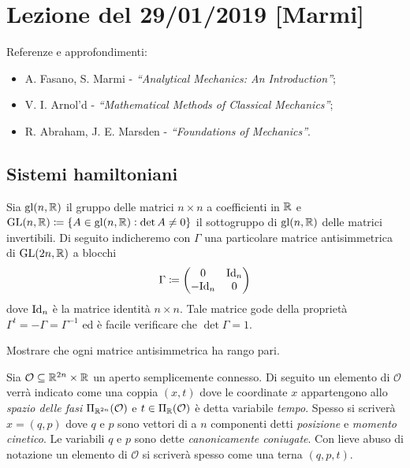 \section{Lezione del 29/01/2019 [Marmi]}
Referenze e approfondimenti:
\begin{itemize}
    \item A. Fasano, S. Marmi - \emph{``Analytical Mechanics: An Introduction''};
    \item V. I. Arnol'd - \emph{``Mathematical Methods of Classical Mechanics''};
    \item R. Abraham, J. E. Marsden - \emph{``Foundations of Mechanics''}.
\end{itemize}

\subsection{Sistemi hamiltoniani}
Sia $ \mathrm{gl}(n, \mathbb{R}) $ il gruppo delle matrici $ n \times n $ a coefficienti in $ \mathbb{R} $ e $ {\mathrm{GL}(n, \mathbb{R}) \coloneqq \{A \in \mathrm{gl}(n, \mathbb{R}) : \det{A} \neq 0\}} $ il sottogruppo di $ \mathrm{gl}(n, \mathbb{R}) $ delle matrici invertibili. Di seguito indicheremo con $ \Gamma $ una particolare matrice antisimmetrica di $ \mathrm{GL}(2n, \mathbb{R}) $ a blocchi
\begin{equation}
    \Gamma \coloneqq
    \begin{pmatrix}
        0 & \mathrm{Id}_{n} \\
        -\mathrm{Id}_{n} & 0 \\
    \end{pmatrix}
\end{equation}
dove $ \mathrm{Id}_n $ è la matrice identità $ n \times n $. Tale matrice gode della proprietà $ \Gamma^t = -\Gamma = \Gamma^{-1} $ ed è facile verificare che $ \det{\Gamma} = 1 $. \\

\begin{exercise}
    Mostrare che ogni matrice antisimmetrica ha rango pari.
\end{exercise}

Sia $ \mathcal{O} \subseteq \mathbb{R}^{2n} \times \mathbb{R} $ un aperto semplicemente connesso. Di seguito un elemento di $ \mathcal{O} $ verrà indicato come una coppia $ (x, t) $ dove le coordinate $ x $ appartengono allo \emph{spazio delle fasi} $ \Pi_{\mathbb{R}^{2n}}(\mathcal{O}) $ e $ t \in \Pi_{\mathbb{R}}(\mathcal{O}) $ è detta variabile \emph{tempo}. Spesso si scriverà $ x = (q, p) $ dove $ q $ e $ p $ sono vettori di a $ n $ componenti detti \emph{posizione} e \emph{momento cinetico}. Le variabili $ q $ e $ p $ sono dette \emph{canonicamente coniugate}. Con lieve abuso di notazione un elemento di $ \mathcal{O} $ si scriverà spesso come una terna $ (q, p, t) $. \\

